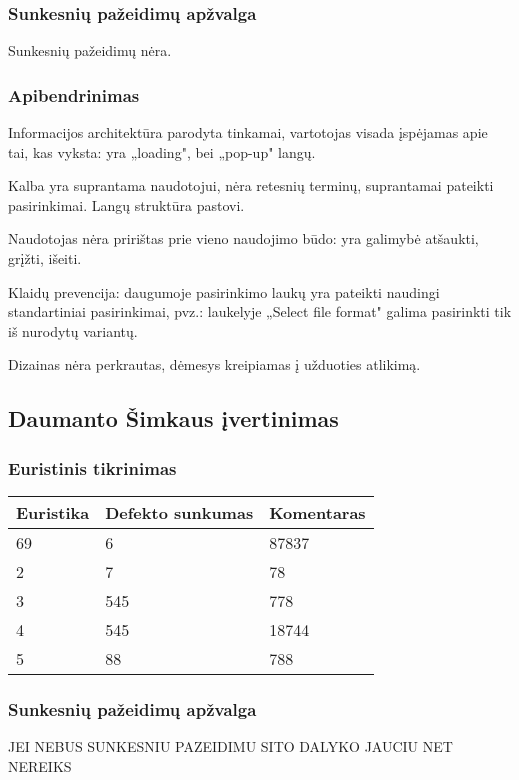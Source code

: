 \documentclass{VUMIFPSkursinis}
\begin{document}
\subsubsection{Sunkesnių pažeidimų apžvalga}
Sunkesnių pažeidimų nėra.

\subsubsection{Apibendrinimas}
Informacijos architektūra parodyta tinkamai, vartotojas visada įspėjamas apie tai, kas vyksta: yra „loading", bei „pop-up" langų.

Kalba yra suprantama naudotojui, nėra retesnių terminų, suprantamai pateikti pasirinkimai. Langų struktūra pastovi.

Naudotojas nėra pririštas prie vieno naudojimo būdo: yra galimybė atšaukti, grįžti, išeiti.

Klaidų prevencija: daugumoje pasirinkimo laukų yra pateikti naudingi standartiniai pasirinkimai, pvz.: laukelyje „Select file format" galima pasirinkti tik iš nurodytų variantų.

Dizainas nėra perkrautas, dėmesys kreipiamas į užduoties atlikimą.

\subsection{Daumanto Šimkaus įvertinimas}
\subsubsection{Euristinis tikrinimas}
\begin{center}
 \begin{tabular}{|| p{4cm} | p{4cm} | p{8cm} ||} 
 \hline
 Euristika & Defekto sunkumas & Komentaras \\
 \hline\hline
 69 & 6 & 87837 \\ 
 \hline
 2 & 7 & 78 \\
 \hline
 3 & 545 & 778 \\
 \hline
 4 & 545 & 18744 \\
 \hline
 5 & 88 & 788 \\  %
 \hline                 %
\end{tabular}	
\end{center}

\subsubsection{Sunkesnių pažeidimų apžvalga}
JEI NEBUS SUNKESNIU PAZEIDIMU SITO DALYKO JAUCIU NET NEREIKS
\end{document}
